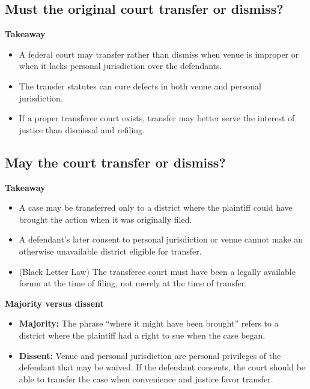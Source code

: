 \documentclass[11pt]{tex/lawoutline}
\begin{document}
\subsection{Must the original court transfer or dismiss?}

{
\textbf{Takeaway}
\begin{itemize}
    \item A federal court may transfer rather than dismiss when venue is improper or when it lacks personal jurisdiction over the defendants.
    \item The transfer statutes can cure defects in both venue and personal jurisdiction.
    \item If a proper transferee court exists, transfer may better serve the interest of justice than dismissal and refiling.
\end{itemize}
}

\subsection{May the court transfer or dismiss?}

{
\textbf{Takeaway}
\begin{itemize}
    \item A case may be transferred only to a district where the plaintiff could have brought the action when it was originally filed.
    \item A defendant's later consent to personal jurisdiction or venue cannot make an otherwise unavailable district eligible for transfer.
    \item (Black Letter Law) The transferee court must have been a legally available forum at the time of filing, not merely at the time of transfer.
\end{itemize}

\textbf{Majority versus dissent}
\begin{itemize}
    \item \textbf{Majority:} The phrase ``where it might have been brought'' refers to a district where the plaintiff had a right to sue when the case began.
    \item \textbf{Dissent:} Venue and personal jurisdiction are personal privileges of the defendant that may be waived. If the defendant consents, the court should be able to transfer the case when convenience and justice favor transfer.
\end{itemize}
}
\end{document}

